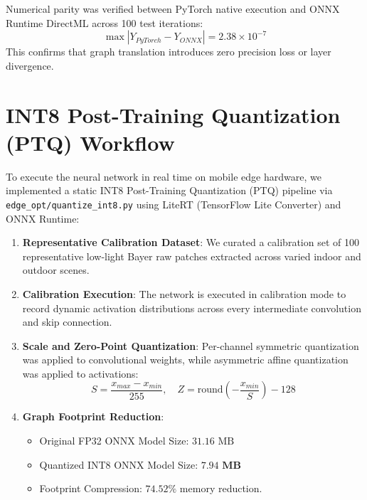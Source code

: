 Numerical parity was verified between PyTorch native execution and ONNX Runtime DirectML across 100 test iterations:
\begin{equation}
\max |Y_{PyTorch} - Y_{ONNX}| = 2.38 \times 10^{-7}
\label{eq:onnx_parity}
\end{equation}
This confirms that graph translation introduces zero precision loss or layer divergence.

\section{INT8 Post-Training Quantization (PTQ) Workflow}
To execute the neural network in real time on mobile edge hardware, we implemented a static INT8 Post-Training Quantization (PTQ) pipeline via \texttt{edge\_opt/quantize\_int8.py} using LiteRT (TensorFlow Lite Converter) and ONNX Runtime:
\begin{enumerate}
    \item \textbf{Representative Calibration Dataset}: We curated a calibration set of 100 representative low-light Bayer raw patches extracted across varied indoor and outdoor scenes.
    \item \textbf{Calibration Execution}: The network is executed in calibration mode to record dynamic activation distributions across every intermediate convolution and skip connection.
    \item \textbf{Scale and Zero-Point Quantization}: Per-channel symmetric quantization was applied to convolutional weights, while asymmetric affine quantization was applied to activations:
    \begin{equation}
    S = \frac{x_{max} - x_{min}}{255}, \quad Z = \text{round}\left(-\frac{x_{min}}{S}\right) - 128
    \end{equation}
    \item \textbf{Graph Footprint Reduction}:
    \begin{itemize}
        \item Original FP32 ONNX Model Size: $31.16\text{ MB}$
        \item Quantized INT8 ONNX Model Size: $\mathbf{7.94\text{ MB}}$
        \item Footprint Compression: $\mathbf{74.52\%}$ memory reduction.
    \end{itemize}
\end{enumerate}

